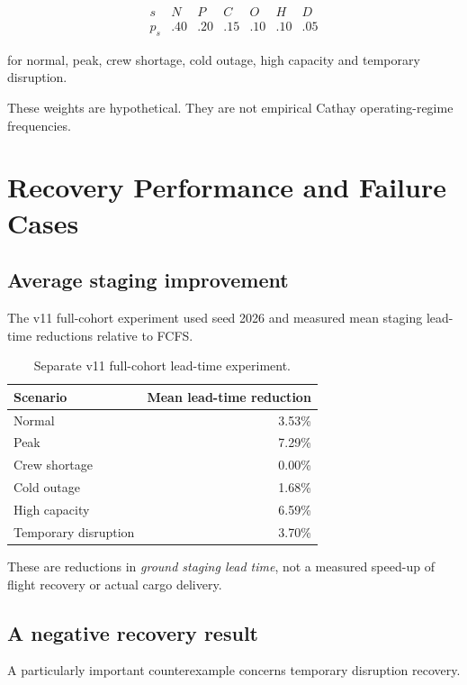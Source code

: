 \documentclass[10pt,a4paper]{article}
\theoremstyle{plain}
\theoremstyle{definition}
\theoremstyle{remark}
\begin{document}
\[
\begin{array}{c|cccccc}
s&
N&P&C&O&H&D\\
\hline
p_s&
.40&.20&.15&.10&.10&.05
\end{array}
\]

for normal, peak, crew shortage,
cold outage, high capacity
and temporary disruption.

These weights are hypothetical.
They are not empirical Cathay
operating-regime frequencies.

\section{Recovery Performance and Failure Cases}

\subsection{Average staging improvement}

The v11 full-cohort experiment
used seed 2026 and measured
mean staging lead-time reductions
relative to FCFS.

\begin{table}[!htbp]
\centering
\caption{
Separate v11 full-cohort
lead-time experiment.
}
\small
\begin{tabular}{@{}lr@{}}
\toprule
Scenario & Mean lead-time reduction \\
\midrule
Normal & 3.53\% \\
Peak & 7.29\% \\
Crew shortage & 0.00\% \\
Cold outage & 1.68\% \\
High capacity & 6.59\% \\
Temporary disruption & 3.70\% \\
\bottomrule
\end{tabular}
\end{table}

These are reductions in
\emph{ground staging lead time},
not a measured speed-up of
flight recovery or actual cargo delivery.

\subsection{A negative recovery result}

A particularly important
counterexample concerns
temporary disruption recovery.
\end{document}
